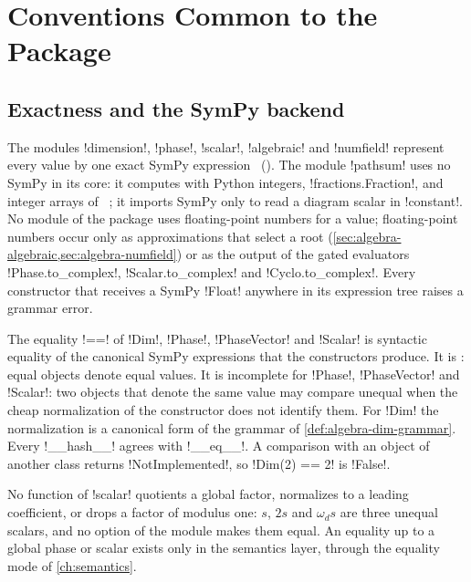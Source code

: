 \section{Conventions Common to the Package}\label{sec:algebra-conventions}

\subsection{Exactness and the SymPy backend}

The modules \py!dimension!, \py!phase!, \py!scalar!, \py!algebraic! and \py!numfield! represent every value by one exact SymPy expression~\cite{meurer2017sympy} (). The module \py!pathsum! uses no SymPy in its core: it computes with Python integers, \py!fractions.Fraction!, and integer arrays of ~\cite{harris2020numpy}; it imports SymPy only to read a diagram scalar in \py!constant!. No module of the package uses floating-point numbers for a value; floating-point numbers occur only as approximations that select a root (\cref{sec:algebra-algebraic,sec:algebra-numfield}) or as the output of the gated evaluators \py!Phase.to_complex!, \py!Scalar.to_complex! and \py!Cyclo.to_complex!. Every constructor that receives a SymPy \py!Float! anywhere in its expression tree raises a grammar error.

\begin{definition}\label{def:algebra-sound-equality}
The equality \py!==! of \py!Dim!, \py!Phase!, \py!PhaseVector! and \py!Scalar! is syntactic equality of the canonical SymPy expressions that the constructors produce. It is : equal objects denote equal values. It is incomplete for \py!Phase!, \py!PhaseVector! and \py!Scalar!: two objects that denote the same value may compare unequal when the cheap normalization of the constructor does not identify them. For \py!Dim! the normalization is a canonical form of the grammar of \cref{def:algebra-dim-grammar}. Every \py!__hash__! agrees with \py!__eq__!. A comparison with an object of another class returns \py!NotImplemented!, so \py!Dim(2) == 2! is \py!False!.
\end{definition}

No function of \py!scalar! quotients a global factor, normalizes to a leading coefficient, or drops a factor of modulus one: $s$, $2s$ and $\omega_d s$ are three unequal scalars, and no option of the module makes them equal. An equality up to a global phase or scalar exists only in the semantics layer, through the equality mode of \cref{ch:semantics}.

